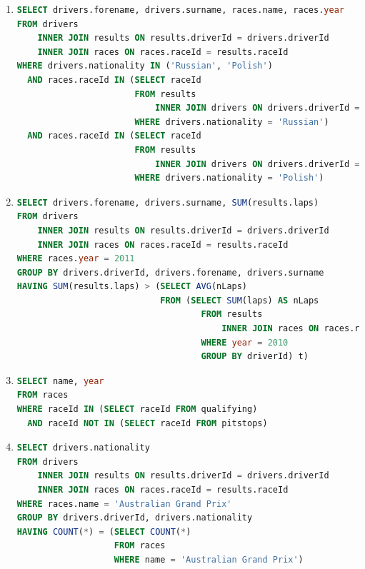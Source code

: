 \documentclass{db-practice}
\begin{document}
\begin{enumerate}
\item
\begin{lstlisting}[language=SQL]
SELECT drivers.forename, drivers.surname, races.name, races.year
FROM drivers
    INNER JOIN results ON results.driverId = drivers.driverId
    INNER JOIN races ON races.raceId = results.raceId
WHERE drivers.nationality IN ('Russian', 'Polish')
  AND races.raceId IN (SELECT raceId
                       FROM results 
                           INNER JOIN drivers ON drivers.driverId = results.driverId
                       WHERE drivers.nationality = 'Russian')
  AND races.raceId IN (SELECT raceId
                       FROM results 
                           INNER JOIN drivers ON drivers.driverId = results.driverId
                       WHERE drivers.nationality = 'Polish')
\end{lstlisting}
      
\item
\begin{lstlisting}[language=SQL]
SELECT drivers.forename, drivers.surname, SUM(results.laps)
FROM drivers
    INNER JOIN results ON results.driverId = drivers.driverId
    INNER JOIN races ON races.raceId = results.raceId
WHERE races.year = 2011
GROUP BY drivers.driverId, drivers.forename, drivers.surname
HAVING SUM(results.laps) > (SELECT AVG(nLaps)
                            FROM (SELECT SUM(laps) AS nLaps
                                    FROM results
                                        INNER JOIN races ON races.raceId = results.raceId
                                    WHERE year = 2010
                                    GROUP BY driverId) t)
\end{lstlisting}

\item
\begin{lstlisting}[language=SQL]
SELECT name, year
FROM races
WHERE raceId IN (SELECT raceId FROM qualifying)
  AND raceId NOT IN (SELECT raceId FROM pitstops)
\end{lstlisting}

\item
\begin{lstlisting}[language=SQL]
SELECT drivers.nationality
FROM drivers
    INNER JOIN results ON results.driverId = drivers.driverId
    INNER JOIN races ON races.raceId = results.raceId
WHERE races.name = 'Australian Grand Prix'
GROUP BY drivers.driverId, drivers.nationality
HAVING COUNT(*) = (SELECT COUNT(*)
                   FROM races
                   WHERE name = 'Australian Grand Prix')
\end{lstlisting}


\end{enumerate}
\end{document}
